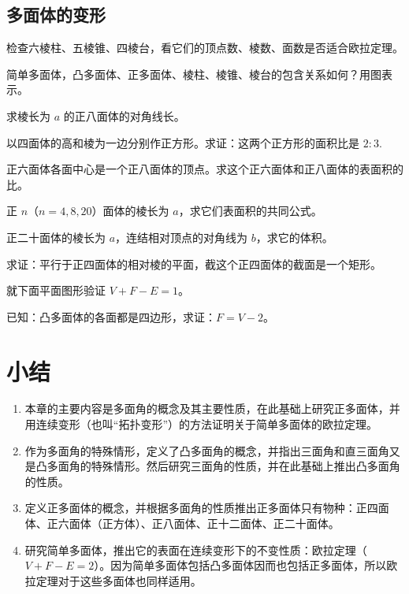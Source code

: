 \subsection{多面体的变形}
\begin{Practice}
  \begin{question}
    \item 检查六棱柱、五棱锥、四棱台，看它们的顶点数、棱数、面数是否适合欧拉定理。
    \item 简单多面体，凸多面体、正多面体、棱柱、棱锥、棱台的包含关系如何？用图表示。 
  \end{question}
\end{Practice}
\begin{Exercise}
  \begin{question}
    \item 求棱长为 $a$ 的正八面体的对角线长。
    \item 以四面体的高和棱为一边分别作正方形。求证：这两个正方形的面积比是 $2:3$.
    \item 正六面体各面中心是一个正八面体的顶点。求这个正六面体和正八面体的表面积的比。
    \item 正 $n$（$n=4,8,20$）面体的棱长为 $a$，求它们表面积的共同公式。
    \item 正二十面体的棱长为 $a$，连结相对顶点的对角线为 $b$，求它的体积。
    \item 求证：平行于正四面体的相对棱的平面，截这个正四面体的截面是一个矩形。
    \item 就下面平面图形验证 $V+F-E=1$。
    \item 已知：凸多面体的各面都是四边形，求证：$F=V-2$。
  \end{question}
\end{Exercise}

\section*{小结}
\begin{enumerate}[C、,itemindent=4.5em]
  \item 本章的主要内容是多面角的概念及其主要性质，在此基础上研究正多面体，并用连续变形（也叫“拓扑变形”）的方法证明关于简单多面体的欧拉定理。
  \item 作为多面角的特殊情形，定义了凸多面角的概念，并指出三面角和直三面角又是凸多面角的特殊情形。然后研究三面角的性质，并在此基础上推出凸多面角的性质。
  \item 定义正多面体的概念，并根据多面角的性质推出正多面体只有物种：正四面体、正六面体（正方体）、正八面体、正十二面体、正二十面体。
  \item 研究简单多面体，推出它的表面在连续变形下的不变性质：欧拉定理（$V+F-E=2$）。因为简单多面体包括凸多面体因而也包括正多面体，所以欧拉定理对于这些多面体也同样适用。
\end{enumerate}
